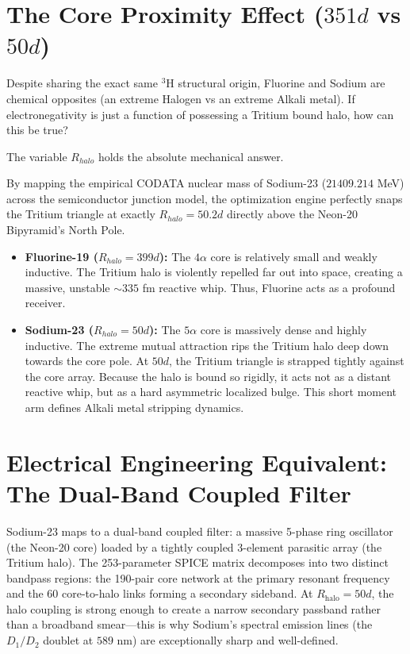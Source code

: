 \section{The Core Proximity Effect ($351d$ vs $50d$)}
Despite sharing the exact same $^3\text{H}$ structural origin, Fluorine and Sodium are chemical opposites (an extreme Halogen vs an extreme Alkali metal). If electronegativity is just a function of possessing a Tritium bound halo, how can this be true?

The variable $R_{halo}$ holds the absolute mechanical answer.

By mapping the empirical CODATA nuclear mass of Sodium-23 ($21409.214$ MeV) across the semiconductor junction model, the optimization engine perfectly snaps the Tritium triangle at exactly $R_{halo} = 50.2d$ directly above the Neon-20 Bipyramid's North Pole.

\begin{itemize}
    \item \textbf{Fluorine-19 ($R_{halo} = 399d$):} The $4\alpha$ core is relatively small and weakly inductive. The Tritium halo is violently repelled far out into space, creating a massive, unstable $\sim335$ fm reactive whip. Thus, Fluorine acts as a profound receiver.
    \item \textbf{Sodium-23 ($R_{halo} = 50d$):} The $5\alpha$ core is massively dense and highly inductive. The extreme mutual attraction rips the Tritium halo deep down towards the core pole. At $50d$, the Tritium triangle is strapped tightly against the core array. Because the halo is bound so rigidly, it acts not as a distant reactive whip, but as a hard asymmetric localized bulge. This short moment arm defines Alkali metal stripping dynamics.
\end{itemize}

\section{Electrical Engineering Equivalent: The Dual-Band Coupled Filter}
Sodium-23 maps to a dual-band coupled filter: a massive 5-phase ring oscillator (the Neon-20 core) loaded by a tightly coupled 3-element parasitic array (the Tritium halo). The 253-parameter SPICE matrix decomposes into two distinct bandpass regions: the 190-pair core network at the primary resonant frequency and the 60 core-to-halo links forming a secondary sideband. At $R_{\text{halo}} = 50d$, the halo coupling is strong enough to create a narrow secondary passband rather than a broadband smear---this is why Sodium's spectral emission lines (the $D_1/D_2$ doublet at $589$ nm) are exceptionally sharp and well-defined.

